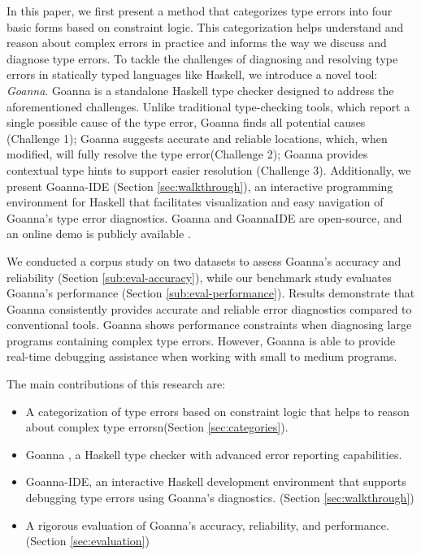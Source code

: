 \documentclass[pdflatex,lineno,sn-nature,Numbered]{sn-jnl}%
\begin{document}
 In this paper, we first present a method that categorizes type errors into four basic forms based on constraint logic. This categorization helps understand and reason about complex errors in practice and informs the way we discuss and diagnose type errors. To tackle the challenges of diagnosing and resolving type errors in statically typed languages like Haskell, we introduce a novel tool: \textit{Goanna}. Goanna is a standalone Haskell type checker designed to address the aforementioned challenges. Unlike traditional type-checking tools, which report a single possible cause of the type error, Goanna finds all potential causes (Challenge 1); Goanna suggests accurate and reliable locations, which, when modified, will fully resolve the type error(Challenge 2); Goanna provides contextual type hints to support easier resolution (Challenge 3). Additionally, we present Goanna-IDE (Section \ref{sec:walkthrough}), an interactive programming environment for Haskell that facilitates visualization and easy navigation of Goanna's type error diagnostics. Goanna and GoannaIDE are open-source, and an online demo is publicly available \cite{Fu2025-le}. 

We conducted a corpus study on two datasets to assess Goanna's accuracy and reliability (Section \ref{sub:eval-accuracy}), while our benchmark study evaluates Goanna's performance (Section \ref{sub:eval-performance}). Results demonstrate that Goanna consistently provides accurate and reliable error diagnostics compared to conventional tools. Goanna shows performance constraints when diagnosing large programs containing complex type errors. However, Goanna is able to provide real-time debugging assistance when working with small to medium programs.

The main contributions of this research are:
\begin{itemize}
    \item A categorization of type errors based on constraint logic that helps to reason about complex type errorsn(Section \ref{sec:categories}).
    \item Goanna \cite{Fu2025-le}, a Haskell type checker with advanced error reporting capabilities.
    \item Goanna-IDE, an interactive Haskell development environment that supports debugging type errors using Goanna's diagnostics. (Section \ref{sec:walkthrough})
    \item A rigorous evaluation of Goanna's accuracy, reliability, and performance. (Section \ref{sec:evaluation})
\end{itemize}
\end{document}
